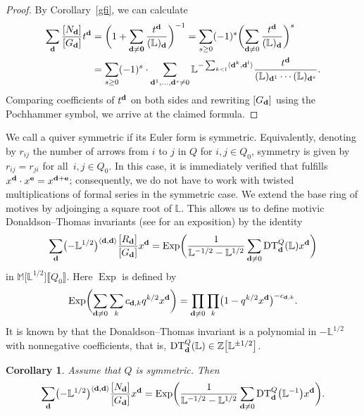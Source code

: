\documentclass[pdftex]{sigma}
\numberwithin{equation}{section}
\newtheorem{Corollary}[Theorem]{Corollary}
\theoremstyle{definition}
\begin{document}
\begin{proof} By Corollary~\ref{gfi}, we can calculate
\begin{align*}
\sum_{\bf d}\frac{[N_{\bf d}]}{[G_{\bf d}]}t^{\bf d}&=\biggl(1+\sum_{\bf d\not={0}}\frac{t^{\bf d}}{(\mathbb{L})_{\bf d}}\biggr)^{-1}=\sum_{s\geq 0}(-1)^s\biggl(\sum_{{\bf d}\not=0}\frac{t^{\bf d}}{(\mathbb{L})_{\bf d}}\biggr)^s\\
&=\sum_{s\geq 0}(-1)^s\cdot
\sum_{{\bf d}^1,\dots,{\bf d}^s\not=0}\mathbb{L}^{-\sum_{k<l}\langle{\bf d}^k,{\bf d}^l\rangle}
\frac{t^{\bf d}}{(\mathbb{L})_{{\bf d}^1}\cdots(\mathbb{L})_{{\bf d}^s}}.
\end{align*}
Comparing coefficients of $t^{\bf d}$ on both sides and rewriting $[G_{\bf d}]$ using the Pochhammer symbol, we arrive at the claimed formula.\end{proof}

We call a quiver symmetric if its Euler form is symmetric. Equivalently, denoting by $r_{ij}$ the number of arrows from $i$ to $j$ in $Q$ for $i,j\in Q_0$, symmetry is given by $r_{ij}=r_{ji}$ for all~${i,j\in Q_0}$. In this case, it is immediately verified that
 fulfills $x^{\bf d}\cdot x^{\bf e}=x^{{\bf d}+{\bf e}}$; consequently, we do not have to work with twisted multiplications of formal series in the symmetric case. We extend the base ring of motives by adjoinging a square root of $\mathbb{L}$. This allows us to define motivic Donaldson--Thomas invariants (see \cite{RDT} for an exposition) by the identity
\[\sum_{\mathbf d}\bigl(-\mathbb{L}^{1/2}\bigr)^{\langle\mathbf{d},\mathbf{d}\rangle}\frac{[R_\mathbf{d}]}{[G_\mathbf{d}]}x^\mathbf{d} =\operatorname{Exp}\biggl(\frac{1}{\mathbb{L}^{-1/2}-\mathbb{L}^{1/2}}\sum_{\mathbf{d}\not=0}{\rm DT}^Q_\mathbf{d}(\mathbb{L}) x^\mathbf{d}\biggr)\]
in $\mathbb{M}\big[\mathbb{L}^{1/2}\big]\llbracket Q_0\rrbracket$. Here $\operatorname{Exp}$ is defined by
\[\operatorname{Exp}\biggl(\sum_{{\bf d}\not=0}\sum_kc_{{\bf d},k}q^{k/2}x^{\bf d}\biggr)=\prod_{{\bf d}\not=0}\prod_k\bigl(1-q^{k/2}x^{\bf d}\bigr)^{-c_{{\bf d},k}}.\]
It is known by \cite{E} that the Donaldson--Thomas invariant is a polynomial in $-\mathbb{L}^{1/2}$ with nonnegative coefficients, that is, ${\rm DT}^Q_\mathbf{d}(\mathbb{L})\in \mathbb{Z}\big[\mathbb{L}^{\pm 1/2}\big]$.

\begin{Corollary} Assume that $Q$ is symmetric. Then \[\sum_\mathbf{d}\bigl(-\mathbb{L}^{1/2}\bigr)^{\langle\mathbf{d},\mathbf{d}\rangle} \frac{[N_\mathbf{d}]}{[G_\mathbf{d}]}x^\mathbf{d}=\operatorname{Exp}\biggl(\frac{1}{\mathbb{L}^{-1/2}-\mathbb{L}^{1/2}}\sum_{\mathbf{d}\not=0}{\rm DT}^Q_{\bf d}\bigl(\mathbb{L}^{-1}\bigr)x^\mathbf{d}\biggr).\]
\end{Corollary}
\end{document}
